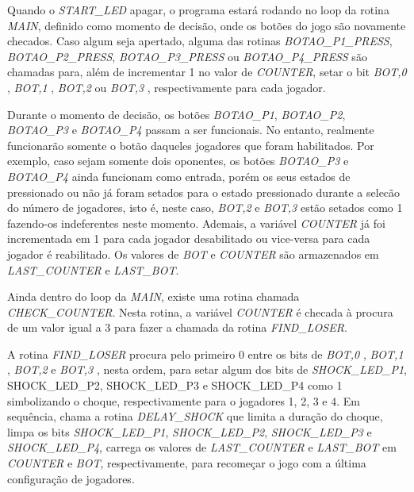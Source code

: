 \documentclass[a4paper,10pt]{article}
\begin{document}
Quando o \textit{START\_LED} apagar, o programa estará rodando no loop da rotina \textit{MAIN}, definido como momento de decisão, onde os botões do jogo são novamente checados. Caso algum seja apertado, alguma das rotinas \textit{BOTAO\_P1\_PRESS}, \textit{BOTAO\_P2\_PRESS}, \textit{BOTAO\_P3\_PRESS} ou \textit{BOTAO\_P4\_PRESS} são chamadas para, além de incrementar 1 no valor de \textit{COUNTER}, setar o bit \textit{BOT,0} , \textit{BOT,1} , \textit{BOT,2} ou \textit{BOT,3} , respectivamente para cada jogador.

Durante o momento de decisão, os botões \textit{BOTAO\_P1}, \textit{BOTAO\_P2}, \textit{BOTAO\_P3} e \textit{BOTAO\_P4} passam a ser funcionais. No entanto, realmente funcionarão somente o botão daqueles jogadores que foram habilitados. Por exemplo, caso sejam somente dois oponentes, os botões \textit{BOTAO\_P3} e \textit{BOTAO\_P4} ainda funcionam como entrada, porém os seus estados de pressionado ou não já foram setados para o estado pressionado durante a selecão do número de jogadores, isto é, neste caso, \textit{BOT,2} e \textit{BOT,3} estão setados como 1 fazendo-os indeferentes neste momento. Ademais, a variável \textit{COUNTER} já foi incrementada em 1 para cada jogador desabilitado ou vice-versa para cada jogador é reabilitado. Os valores de \textit{BOT} e \textit{COUNTER} são armazenados em \textit{LAST\_COUNTER} e \textit{LAST\_BOT}. 

Ainda dentro do loop da \textit{MAIN}, existe uma rotina chamada \textit{CHECK\_COUNTER}. Nesta rotina, a variável \textit{COUNTER} é checada à procura de um valor igual a 3 para fazer a chamada da rotina \textit{FIND\_LOSER}.

A rotina \textit{FIND\_LOSER} procura pelo primeiro 0 entre os bits de \textit{BOT,0} , \textit{BOT,1} , \textit{BOT,2} e \textit{BOT,3} , nesta ordem, para setar algum dos bits de \textit{SHOCK\_LED\_P1}, {SHOCK\_LED\_P2}, {SHOCK\_LED\_P3} e {SHOCK\_LED\_P4} como 1 simbolizando o choque, respectivamente para o jogadores 1, 2, 3 e 4. Em sequência, chama a rotina \textit{DELAY\_SHOCK} que limita a duração do choque, limpa os bits \textit{SHOCK\_LED\_P1}, \textit{SHOCK\_LED\_P2}, \textit{SHOCK\_LED\_P3} e \textit{SHOCK\_LED\_P4}, carrega os valores de \textit{LAST\_COUNTER} e \textit{LAST\_BOT} em \textit{COUNTER} e \textit{BOT}, respectivamente, para recomeçar o jogo com a última configuração de jogadores.
\end{document}
